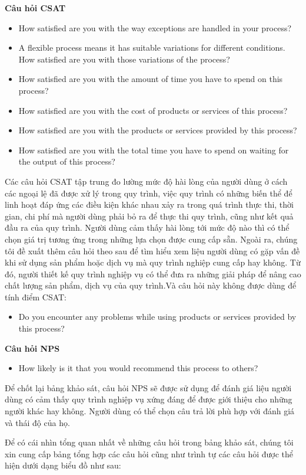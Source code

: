 \textbf{Câu hỏi CSAT}
\begin{itemize}
    \item How satisfied are you with the way exceptions are handled in your process?
    \item A flexible process means it has suitable variations for different conditions. How satisfied are you with those variations of the process?
    \item How satisfied are you with the amount of time you have to spend on this process?
    \item How satisfied are you with the cost of products or services of this process?
    \item How satisfied are you with the products or services provided by this process?
    \item How satisfied are you with the total time you have to spend on waiting for the output of this process?
\end{itemize}
\par
Các câu hỏi CSAT tập trung đo lường mức độ hài lòng của người dùng ở cách các ngoại lệ đã được xử lý trong quy trình, việc quy trình có những biến thể để linh hoạt đáp ứng các điều kiện khác nhau xảy ra trong quá trình thực thi, thời gian, chi phí mà người dùng phải bỏ ra để thực thi quy trình, cũng như kết quả đầu ra của quy trình. Người dùng cảm thấy hài lòng tới mức độ nào thì có thể chọn giá trị tương ứng trong những lựa chọn được cung cấp sẵn. Ngoài ra, chúng tôi đề xuất thêm câu hỏi theo sau để tìm hiểu xem liệu người dùng có gặp vấn đề khi sử dụng sản phẩm hoặc dịch vụ mà quy trình nghiệp cung cấp hay không. Từ đó, người thiết kế quy trình nghiệp vụ có thể đưa ra những giải pháp để nâng cao chất lượng sản phẩm, dịch vụ của quy trình.Và câu hỏi này không được dùng để tính điểm CSAT:
\begin{itemize}
    \item Do you encounter any problems while using products or services provided by this process?
\end{itemize}
\par
\textbf{Câu hỏi NPS}
\begin{itemize}
    \item How likely is it that you would recommend this process to others?
\end{itemize}
\par
Để chốt lại bảng khảo sát, câu hỏi NPS sẽ được sử dụng để đánh giá liệu người dùng có cảm thấy quy trình nghiệp vụ xứng đáng để được giới thiệu cho những người khác hay không. Người dùng có thể chọn câu trả lời phù hợp với đánh giá và thái độ của họ.
\par
Để có cái nhìn tổng quan nhất về những câu hỏi trong bảng khảo sát, chúng tôi xin cung cấp bảng tổng hợp các câu hỏi cũng như trình tự các câu hỏi được thể hiện dưới dạng biểu đồ như sau:

